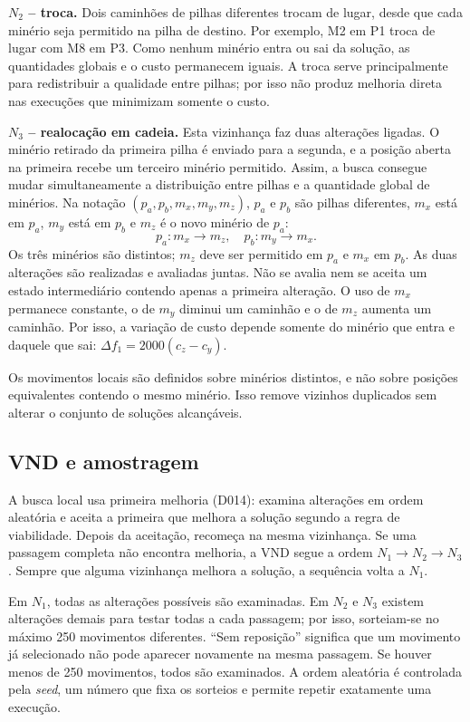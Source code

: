 \documentclass[10pt,twocolumn,a4paper]{article}
\begin{document}
\noindent\textbf{$N_2$ -- troca.} Dois caminhões de pilhas diferentes trocam de lugar, desde que cada minério seja permitido na pilha de destino. Por exemplo, M2 em P1 troca de lugar com M8 em P3. Como nenhum minério entra ou sai da solução, as quantidades globais e o custo permanecem iguais. A troca serve principalmente para redistribuir a qualidade entre pilhas; por isso não produz melhoria direta nas execuções que minimizam somente o custo.

\noindent\textbf{$N_3$ -- realocação em cadeia.} Esta vizinhança faz duas alterações ligadas. O minério retirado da primeira pilha é enviado para a segunda, e a posição aberta na primeira recebe um terceiro minério permitido. Assim, a busca consegue mudar simultaneamente a distribuição entre pilhas e a quantidade global de minérios. Na notação $(p_a,p_b,m_x,m_y,m_z)$, $p_a$ e $p_b$ são pilhas diferentes, $m_x$ está em $p_a$, $m_y$ está em $p_b$ e $m_z$ é o novo minério de $p_a$:
\begin{equation}
p_a : m_x \to m_z, \quad p_b : m_y \to m_x.
\end{equation}
Os três minérios são distintos; $m_z$ deve ser permitido em $p_a$ e $m_x$ em $p_b$. As duas alterações são realizadas e avaliadas juntas. Não se avalia nem se aceita um estado intermediário contendo apenas a primeira alteração. O uso de $m_x$ permanece constante, o de $m_y$ diminui um caminhão e o de $m_z$ aumenta um caminhão. Por isso, a variação de custo depende somente do minério que entra e daquele que sai: $\Delta f_1 = 2000(c_z-c_y)$.

Os movimentos locais são definidos sobre minérios distintos, e não sobre posições equivalentes contendo o mesmo minério. Isso remove vizinhos duplicados sem alterar o conjunto de soluções alcançáveis.

\subsection{VND e amostragem}

A busca local usa primeira melhoria (D014): examina alterações em ordem aleatória e aceita a primeira que melhora a solução segundo a regra de viabilidade. Depois da aceitação, recomeça na mesma vizinhança. Se uma passagem completa não encontra melhoria, a VND segue a ordem $N_1 \to N_2 \to N_3$. Sempre que alguma vizinhança melhora a solução, a sequência volta a $N_1$.

Em $N_1$, todas as alterações possíveis são examinadas. Em $N_2$ e $N_3$ existem alterações demais para testar todas a cada passagem; por isso, sorteiam-se no máximo 250 movimentos diferentes. ``Sem reposição'' significa que um movimento já selecionado não pode aparecer novamente na mesma passagem. Se houver menos de 250 movimentos, todos são examinados. A ordem aleatória é controlada pela \emph{seed}, um número que fixa os sorteios e permite repetir exatamente uma execução.
\end{document}
